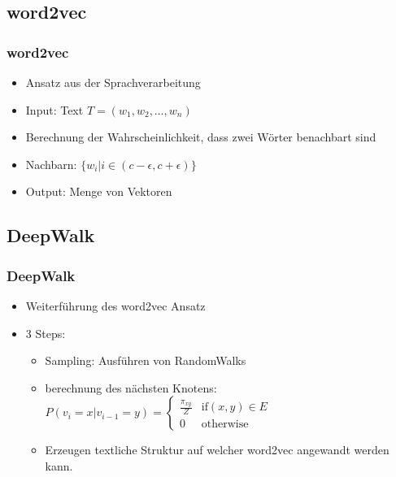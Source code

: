 \documentclass{beamer}
\begin{document}
\subsection{word2vec}
\begin{frame}
  \frametitle{word2vec}
  \begin{itemize}
    \item Ansatz aus der Sprachverarbeitung
    \item Input: Text \(T = (w_1, w_2, \ldots, w_n)\)
    \item Berechnung der Wahrscheinlichkeit, dass zwei Wörter benachbart sind
    \item Nachbarn: \(\{w_i | i \in (c-\epsilon, c+\epsilon)\}\)
    \item Output: Menge von Vektoren
  \end{itemize}
\end{frame}
   
\subsection{DeepWalk}
\begin{frame}
  \frametitle{DeepWalk}
  \begin{itemize}
    \item Weiterführung des word2vec Ansatz
    \item 3 Steps: 
    \begin{itemize}
      \item Sampling: Ausführen von RandomWalks
      \item berechnung des nächsten Knotens:  \(P(v_i = x|v_{i-1} = y) = \begin{cases} \frac{\pi_{xy}}{Z} &\text{if} (x,y) \in E \\ 0 & \text{otherwise} \end{cases}\)
      \item Erzeugen textliche Struktur auf welcher word2vec angewandt werden kann.
    \end{itemize}
  \end{itemize}
\end{frame}
\end{document}
